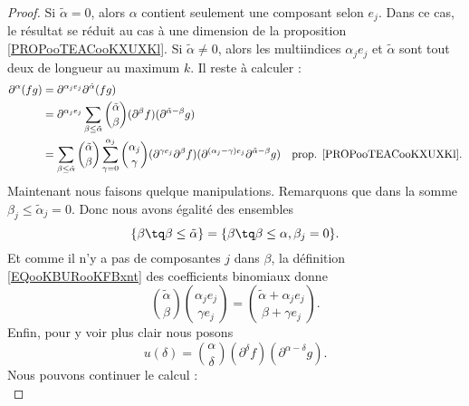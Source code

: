\begin{proof}
	Si \( \tilde  \alpha=0\), alors \( \alpha\) contient seulement une composant selon \( e_j\). Dans ce cas, le résultat se réduit au cas à une dimension de la proposition \ref{PROPooTEACooKXUXKl}. Si \( \tilde \alpha\neq 0\), alors les multiindices \( \alpha_je_j\) et \( \tilde \alpha\) sont tout deux de longueur au maximum \( k\). Il reste à calculer :
	\begin{subequations}
		\begin{align}
			\partial^{\alpha}(fg) & =\partial^{\alpha_je_j}\partial^{\tilde \alpha}(fg)                                                                                                                                                                                                                    \\
			                      & =\partial^{\alpha_je_j}\sum_{\beta\leq \tilde \alpha}\binom{ \tilde \alpha }{ \beta }(\partial^{\beta}f)(\partial^{\tilde \alpha-\beta}g)                                                                                                                              \\
			                      & =\sum_{\beta\leq \tilde \alpha}\binom{ \tilde \alpha }{ \beta }\sum_{\gamma=0}^{\alpha_j}\binom{ \alpha_j }{ \gamma }(\partial^{\gamma e_j}\partial^{\beta}f)(\partial^{(\alpha_j-\gamma)e_j}\partial^{\tilde \alpha-\beta}g) & \text{prop. \ref{PROPooTEACooKXUXKl}}.
		\end{align}
	\end{subequations}
	Maintenant nous faisons quelque manipulations. Remarquons que dans la somme \( \beta_j\leq \tilde \alpha_j=0\). Donc nous avons égalité des ensembles
	\begin{equation}
		\{ \beta\tq \beta\leq \tilde \alpha \}=\{ \beta\tq \beta\leq \alpha,\beta_j=0 \}.
	\end{equation}
	Et comme il n'y a pas de composantes \( j\) dans \( \beta\), la définition \ref{EQooKBURooKFBxnt} des coefficients binomiaux donne
	\begin{equation}
		\binom{ \tilde \alpha }{ \beta }\binom{ \alpha_je_j }{ \gamma e_j }=\binom{ \tilde \alpha+\alpha_je_j }{ \beta+\gamma e_j }.
	\end{equation}
	Enfin, pour y voir plus clair nous posons
	\begin{equation}
		u(\delta)=\binom{ \alpha }{ \delta }(\partial^{\delta}f)(\partial^{\alpha-\delta}g).
	\end{equation}
	Nous pouvons continuer le calcul :
	\begin{subequations}

\end{subequations}
\end{proof}
